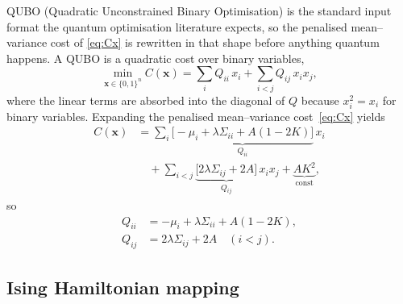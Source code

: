 QUBO (Quadratic Unconstrained Binary Optimisation) is the standard input format the quantum optimisation literature expects, so the penalised mean--variance cost of \cref{eq:Cx} is rewritten in that shape before anything quantum happens. A QUBO is a quadratic cost over binary variables,
\begin{equation}
    \min_{\boldsymbol{x}\in\{0,1\}^n} C(\boldsymbol{x}) = \sum_i Q_{ii}\, x_i + \sum_{i<j} Q_{ij}\, x_i x_j,
\end{equation}
where the linear terms are absorbed into the diagonal of $Q$ because $x_i^2 = x_i$ for binary variables. Expanding the penalised mean--variance cost~\eqref{eq:Cx} yields
\begin{equation}
\begin{aligned}
    C(\boldsymbol{x}) &= \sum_i \underbrace{\bigl[-\mu_i + \lambda\Sigma_{ii} + A(1-2K)\bigr]}_{Q_{ii}}\, x_i \\
    &\quad + \sum_{i<j} \underbrace{\bigl[2\lambda\Sigma_{ij} + 2A\bigr]}_{Q_{ij}}\, x_i x_j + \underbrace{AK^2}_{\text{const}},
\end{aligned}
\end{equation}
so
\begin{equation}\label{eq:Qcoeffs}
    \boxed{
    \begin{aligned}
    Q_{ii} &= -\mu_i + \lambda\Sigma_{ii} + A(1-2K), \\
    Q_{ij} &= 2\lambda\Sigma_{ij} + 2A \quad (i<j).
    \end{aligned}
    }
\end{equation}


\subsection{Ising Hamiltonian mapping}\label{subsec:ising}

